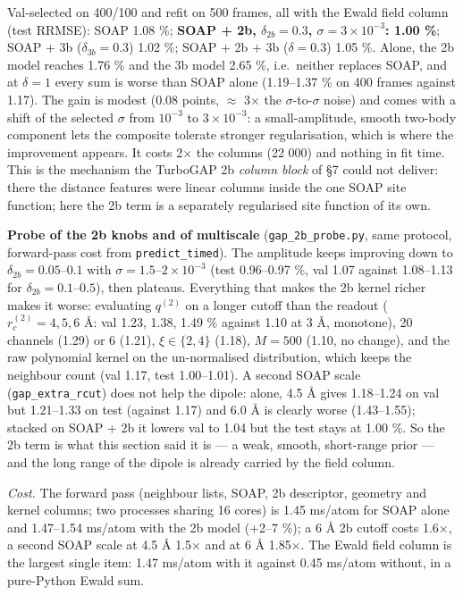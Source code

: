 \documentclass[
  10pt,
]{article}
\begin{document}
Val-selected on 400/100 and refit on 500 frames, all with the Ewald field column (test RRMSE): SOAP
1.08 \%; \textbf{SOAP + 2b, \(\delta_{2b}=0.3\), \(\sigma=3\times10^{-3}\): 1.00 \%}; SOAP + 3b
(\(\delta_{3b}=0.3\)) 1.02 \%; SOAP + 2b + 3b (\(\delta=0.3\)) 1.05 \%. Alone, the 2b model reaches
1.76 \% and the 3b model 2.65 \%, i.e.~neither replaces SOAP, and at \(\delta=1\) every sum is worse
than SOAP alone (1.19--1.37 \% on 400 frames against 1.17). The gain is modest (0.08 points,
\(\approx\) 3\(\times\) the \(\sigma\)-to-\(\sigma\) noise) and comes with a shift of the selected
\(\sigma\) from \(10^{-3}\) to \(3\times10^{-3}\): a small-amplitude, smooth two-body component lets
the composite tolerate stronger regularisation, which is where the improvement appears. It costs
2\(\times\) the columns (22 000) and nothing in fit time. This is the mechanism the TurboGAP 2b
\emph{column block} of §7 could not deliver: there the distance features were linear columns inside
the one SOAP site function; here the 2b term is a separately regularised site function of its own.

\textbf{Probe of the 2b knobs and of multiscale} (\texttt{gap\_2b\_probe.py}, same protocol,
forward-pass cost from \texttt{predict\_timed}). The amplitude keeps improving down to
\(\delta_{2b}=0.05\)--\(0.1\) with \(\sigma=1.5\)--\(2\times10^{-3}\) (test 0.96--0.97 \%, val 1.07
against 1.08--1.13 for \(\delta_{2b}=0.1\)--\(0.5\)), then plateaus. Everything that makes the 2b
kernel richer makes it worse: evaluating \(q^{(2)}\) on a longer cutoff than the readout
(\(r_c^{(2)}=4,5,6\) \AA{}: val 1.23, 1.38, 1.49 \% against 1.10 at 3 \AA{}, monotone), 20 channels
(1.29) or 6 (1.21), \(\xi\in\{2,4\}\) (1.18), \(M=500\) (1.10, no change), and the raw polynomial
kernel on the un-normalised distribution, which keeps the neighbour count (val 1.17, test
1.00--1.01). A second SOAP scale (\texttt{gap\_extra\_rcut}) does not help the dipole: alone, 4.5
\AA{} gives 1.18--1.24 on val but 1.21--1.33 on test (against 1.17) and 6.0 \AA{} is clearly worse
(1.43--1.55); stacked on SOAP + 2b it lowers val to 1.04 but the test stays at 1.00 \%. So the 2b
term is what this section said it is --- a weak, smooth, short-range prior --- and the long range of
the dipole is already carried by the field column.

\emph{Cost.} The forward pass (neighbour lists, SOAP, 2b descriptor, geometry and kernel columns;
two processes sharing 16 cores) is 1.45 ms/atom for SOAP alone and 1.47--1.54 ms/atom with the 2b
model (+2--7 \%); a 6 \AA{} 2b cutoff costs 1.6\(\times\), a second SOAP scale at 4.5 \AA{}
1.5\(\times\) and at 6 \AA{} 1.85\(\times\). The Ewald field column is the largest single item: 1.47
ms/atom with it against 0.45 ms/atom without, in a pure-Python Ewald sum.
\end{document}
